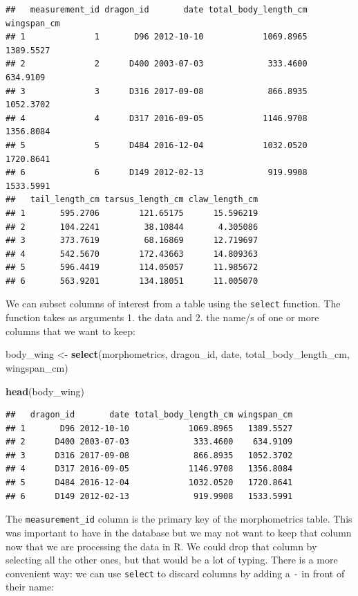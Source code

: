 \documentclass[
]{book}
\newenvironment{Shaded}{\begin{snugshade}}{\end{snugshade}}
\newcommand{\FunctionTok}[1]{\textcolor[rgb]{0.13,0.29,0.53}{\textbf{#1}}}
\newcommand{\NormalTok}[1]{#1}
\newcommand{\OtherTok}[1]{\textcolor[rgb]{0.56,0.35,0.01}{#1}}
\begin{document}
\begin{verbatim}
##   measurement_id dragon_id       date total_body_length_cm wingspan_cm
## 1              1       D96 2012-10-10            1069.8965   1389.5527
## 2              2      D400 2003-07-03             333.4600    634.9109
## 3              3      D316 2017-09-08             866.8935   1052.3702
## 4              4      D317 2016-09-05            1146.9708   1356.8084
## 5              5      D484 2016-12-04            1032.0520   1720.8641
## 6              6      D149 2012-02-13             919.9908   1533.5991
##   tail_length_cm tarsus_length_cm claw_length_cm
## 1       595.2706        121.65175      15.596219
## 2       104.2241         38.10844       4.305086
## 3       373.7619         68.16869      12.719697
## 4       542.5670        172.43663      14.809363
## 5       596.4419        114.05057      11.985672
## 6       563.9201        134.18051      11.005070
\end{verbatim}

We can subset columns of interest from a table using the \texttt{select} function. The
function takes as arguments 1. the data and 2. the name/s of one or more
columns that we want to keep:

\begin{Shaded}
\begin{Highlighting}[]
\NormalTok{body\_wing }\OtherTok{\textless{}{-}} \FunctionTok{select}\NormalTok{(morphometrics, dragon\_id, date, total\_body\_length\_cm, wingspan\_cm)}

\FunctionTok{head}\NormalTok{(body\_wing)}
\end{Highlighting}
\end{Shaded}

\begin{verbatim}
##   dragon_id       date total_body_length_cm wingspan_cm
## 1       D96 2012-10-10            1069.8965   1389.5527
## 2      D400 2003-07-03             333.4600    634.9109
## 3      D316 2017-09-08             866.8935   1052.3702
## 4      D317 2016-09-05            1146.9708   1356.8084
## 5      D484 2016-12-04            1032.0520   1720.8641
## 6      D149 2012-02-13             919.9908   1533.5991
\end{verbatim}

The \texttt{measurement\_id} column is the primary key of the morphometrics table. This
was important to have in the database but we may not want to keep that column
now that we are processing the data in R. We could drop that column by
selecting all the other ones, but that would be a lot of typing. There is a more
convenient way: we can use \texttt{select} to discard columns by adding a \texttt{-} in front
of their name:
\end{document}
